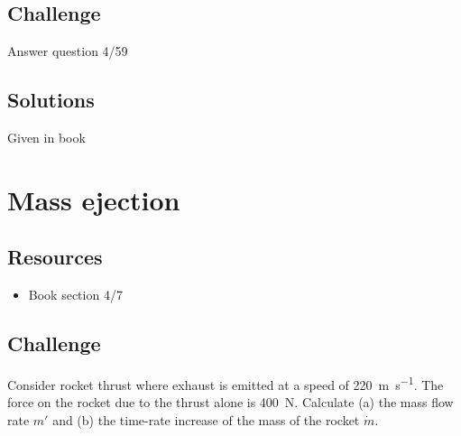 \subsection*{Challenge}
Answer question 4/59

\subsection*{Solutions}
Given in book




%
%
%




\newpage
\section{Mass ejection}

\subsection*{Resources}
\begin{itemize}
    \item Book section 4/7
\end{itemize}

\subsection*{Challenge}
Consider rocket thrust where exhaust is emitted at a speed of \SI{220}{\meter\per\second}. The force on the rocket due to the thrust alone is \SI{400}{\newton}. Calculate (a) the mass flow rate $m'$ and (b) the time-rate increase of the mass of the rocket $\dot{m}$.

